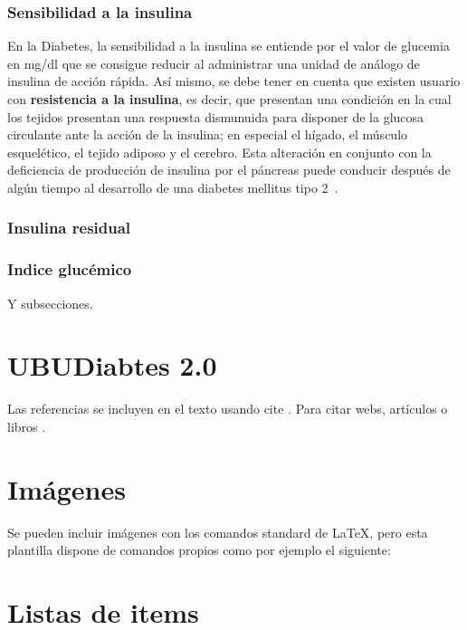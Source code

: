 \subsubsection{Sensibilidad a la insulina}
En la Diabetes, la sensibilidad a la insulina se entiende por el valor de glucemia en mg/dl que se consigue reducir al administrar una unidad de análogo de insulina de acción rápida.
Así mismo, se debe tener en cuenta que existen usuario con \textbf{resistencia a la insulina}, es decir, que presentan una condición en la cual los tejidos presentan una respuesta dismunuida para disponer de la glucosa circulante ante la acción de la insulina; en especial el hígado, el músculo esquelético, el tejido adiposo y el cerebro. Esta alteración en conjunto con la deficiencia de producción de insulina por el páncreas puede conducir después de algún tiempo al desarrollo de una diabetes mellitus tipo 2~\cite{resistenciaIns}.

\subsubsection{Insulina residual}
\subsubsection{Indice glucémico}

Y subsecciones. 


\section{UBUDiabtes 2.0}

Las referencias se incluyen en el texto usando cite \cite{wiki:latex}. Para citar webs, artículos o libros \cite{koza92}.


\section{Imágenes}

Se pueden incluir imágenes con los comandos standard de \LaTeX, pero esta plantilla dispone de comandos propios como por ejemplo el siguiente:




\section{Listas de items}

